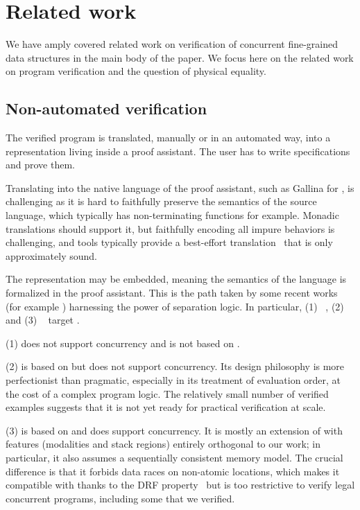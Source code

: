 \section{Related work}
\label{sec:related}

We have amply covered related work on verification of concurrent fine-grained data structures in the main body of the paper. We focus here on the related work on program verification and the question of physical equality.

\subsection{Non-automated verification}

The verified program is translated, manually or in an automated way, into a representation living inside a proof assistant.
The user has to write specifications and prove them.

Translating into the native language of the proof assistant, such as Gallina for \Rocq, is challenging as it is hard to faithfully preserve the semantics of the source language, which typically has non-terminating functions for example. Monadic translations should support it, but faithfully encoding all impure behaviors is challenging, and tools typically provide a best-effort translation~\citep*{coq-of-ocaml,DBLP:conf/cpp/Spector-Zabusky18} that is only approximately sound.

The representation may be embedded, meaning the semantics of the language is formalized in the proof assistant.
This is the path taken by some recent works (for example \citet*{DBLP:journals/pacmpl/GondelmanHPTB23}) harnessing the power of separation logic.
In particular, (1) \CFML~\citep*{DBLP:books/hal/Chargueraud23}, (2) \Osiris~\citep*{SeassauYMP25} and (3) \DRFCaml~\citep*{DBLP:journals/pacmpl/GeorgesPEWDECPD25} target \OCaml.

(1) \CFML does not support concurrency and is not based on \Iris.

(2) \Osiris is based on \Iris but does not support concurrency.
Its design philosophy is more perfectionist than pragmatic, especially in its treatment of evaluation order, at the cost of a complex program logic.
The relatively small number of verified examples suggests that it is not yet ready for practical verification at scale.

(3) \DRFCaml is based on \Iris and does support concurrency.
It is mostly an extension of \HeapLang with features (modalities and stack regions) entirely orthogonal to our work; in particular, it also assumes a sequentially consistent memory model.
The crucial difference is that it forbids data races on non-atomic locations, which makes it compatible with \OCamlFive thanks to the DRF property~\citep*{DBLP:conf/pldi/DolanSM18} but is too restrictive to verify legal concurrent programs, including some that we verified.

